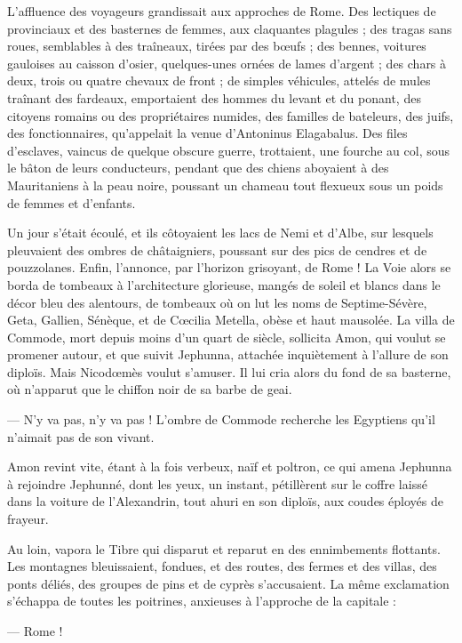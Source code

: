 \documentclass[a4paper, 11pt, oneside, polutonikogreek, french]{article}
\begin{document}
L'affluence des voyageurs grandissait aux approches de Rome. Des lectiques de provinciaux et des basternes de femmes, aux claquantes plagules ; des tragas sans roues, semblables à des traîneaux, tirées par des bœufs ; des bennes, voitures gauloises au caisson d'osier, quelques-unes ornées de lames d'argent ; des chars à deux, trois ou quatre chevaux de front ; de simples véhicules, attelés de mules traînant des fardeaux, emportaient des hommes du levant et du ponant, des citoyens romains ou des propriétaires numides, des familles de bateleurs, des juifs, des fonctionnaires, qu'appelait la venue d'Antoninus Elagabalus. Des files d'esclaves, vaincus de quelque obscure guerre, trottaient, une fourche au col, sous le bâton de leurs conducteurs, pendant que des chiens aboyaient à des Mauritaniens à la peau noire, poussant un chameau tout flexueux sous un poids de femmes et d'enfants.

Un jour s'était écoulé, et ils côtoyaient les lacs de Nemi et d'Albe, sur lesquels pleuvaient des ombres de châtaigniers, poussant sur des pics de cendres et de pouzzolanes. Enfin, l'annonce, par l'horizon grisoyant, de Rome ! La Voie alors se borda de tombeaux à l'architecture glorieuse, mangés de soleil et blancs dans le décor bleu des alentours, de tombeaux où on lut les noms de Septime-Sévère, Geta, Gallien, Sénèque, et de Cœcilia Metella, obèse et haut mausolée. La villa de Commode, mort depuis moins d'un quart de siècle, sollicita Amon, qui voulut se promener autour, et que suivit Jephunna, attachée inquiètement à l'allure de son diploïs. Mais Nicodœmès voulut s'amuser. Il lui cria alors du fond de sa basterne, où n'apparut que le chiffon noir de sa barbe de geai.

--- N'y va pas, n'y va pas ! L'ombre de Commode recherche les Egyptiens qu'il n'aimait pas de son vivant.

Amon revint vite, étant à la fois verbeux, naïf et poltron, ce qui amena Jephunna à rejoindre Jephunné, dont les yeux, un instant, pétillèrent sur le coffre laissé dans la voiture de l'Alexandrin, tout ahuri en son diploïs, aux coudes éployés de frayeur.

Au loin, vapora le Tibre qui disparut et reparut en des ennimbements flottants. Les montagnes bleuissaient, fondues, et des routes, des fermes et des villas, des ponts déliés, des groupes de pins et de cyprès s'accusaient. La même exclamation s'échappa de toutes les poitrines, anxieuses à l'approche de la capitale :

--- Rome !
\end{document}
